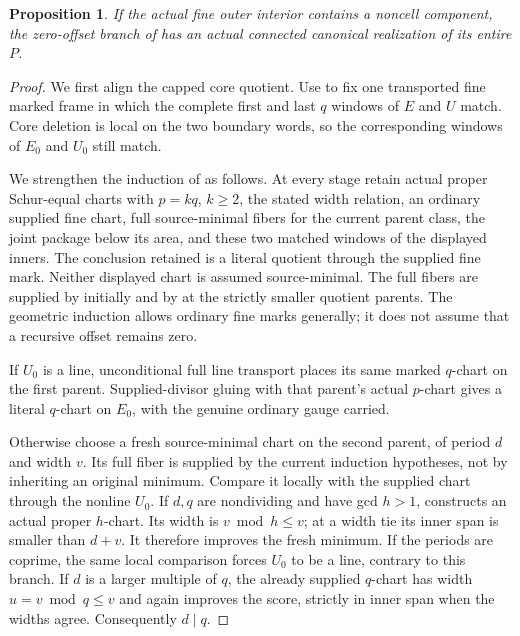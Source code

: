 \documentclass[11pt,a4paper]{amsart}
\numberwithin{equation}{section}
\theoremstyle{plain}
\newtheorem{proposition}[theorem]{Proposition}
\theoremstyle{definition}
\begin{document}
\begin{proposition}
\label{prop:noncell-realization}
If the actual fine outer interior contains a noncell component, the
zero-offset branch of  has an actual connected
canonical realization of its entire \(P\).
\end{proposition}
\begin{proof}
We first align the capped core quotient.  Use 
to fix one transported fine marked frame in which the complete first
and last \(q\) windows of \(E\) and \(U\) match.  Core deletion is
local on the two boundary words, so the corresponding windows of
\(E_0\) and \(U_0\) still match.

We strengthen the induction of  as follows.
At every stage retain actual proper Schur-equal charts with
\(p=kq\), \(k\ge2\), the stated width relation, an ordinary supplied
fine chart, full source-minimal fibers for the current parent class,
the joint package below its area, and these two matched windows of
the displayed inners.  The conclusion retained is a literal quotient
through the supplied fine mark.  Neither displayed chart is assumed
source-minimal.  The full fibers are supplied by
 initially and by  at the
strictly smaller quotient parents.  The geometric induction allows
ordinary fine marks generally; it does not assume that a recursive
offset remains zero.

If \(U_0\) is a line, unconditional full line transport places its
same marked \(q\)-chart on the first parent.  Supplied-divisor gluing
with that parent's actual \(p\)-chart gives a literal \(q\)-chart on
\(E_0\), with the genuine ordinary gauge carried.

Otherwise choose a fresh source-minimal chart on the second parent,
of period \(d\) and width \(v\).  Its full fiber is supplied by the
current induction hypotheses, not by inheriting an original minimum.
Compare it locally with the supplied chart through the nonline \(U_0\).
If \(d,q\) are nondividing and have gcd \(h>1\),
 constructs an actual proper \(h\)-chart.
Its width is \(v\bmod h\le v\); at a width tie its inner span is smaller
than \(d+v\).  It therefore improves the fresh minimum.  If the periods
are coprime, the same local comparison forces \(U_0\) to be a line,
contrary to this branch.  If \(d\) is a larger multiple of \(q\), the
already supplied \(q\)-chart has width \(u=v\bmod q\le v\) and again
improves the score, strictly in inner span when the widths agree.
Consequently \(d\mid q\).


\end{proof}
\end{document}
